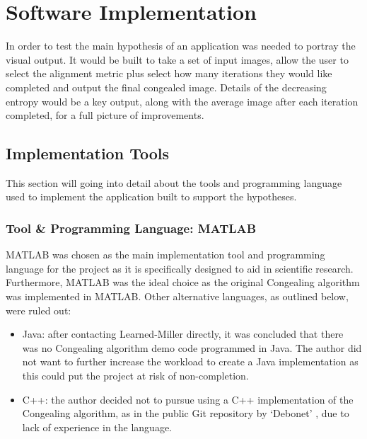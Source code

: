 \chapter{Software Implementation}

In order to test the main hypothesis of  an application was needed to portray the visual output. It would be built to take a set of input images, allow the user to select the alignment metric plus select how many iterations they would like completed and output the final congealed image. Details of the decreasing entropy would be a key output, along with the average image after each iteration completed, for a full picture of improvements.

\section{Implementation Tools}

This section will going into detail about the tools and programming language used to implement the application built to support the hypotheses.

\subsection{Tool \& Programming Language: MATLAB}
\label{ssec:matlab}

MATLAB \cite{MATLAB:2016} was chosen as the main implementation tool and programming language for the project as it is specifically designed to aid in scientific research. Furthermore, MATLAB was the ideal choice as the original \Gls{Congealing} algorithm was implemented in MATLAB. Other alternative languages, as outlined below, were ruled out:

\begin{itemize}
  \item Java: after contacting Learned-Miller directly, it was concluded that there was no \Gls{Congealing} algorithm demo code programmed in Java. The author did not want to further increase the workload to create a Java implementation as this could put the project at risk of non-completion.
  \item C++: the author decided not to pursue using a C++ implementation of the \Gls{Congealing} algorithm, as in the public Git repository by `Debonet' \cite{cpp_congealing}, due to lack of experience in the language.
\end{itemize}

